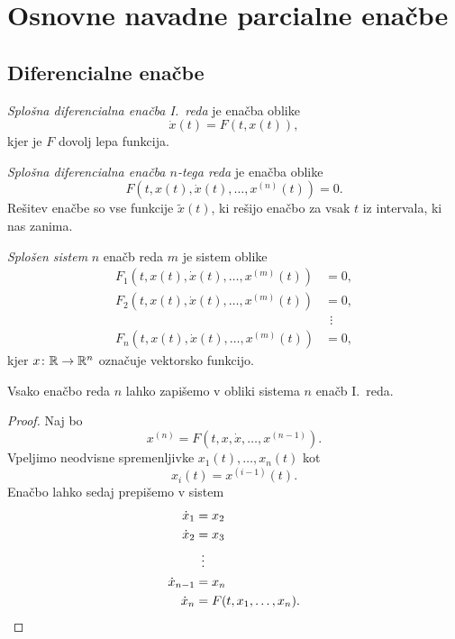 \section{Osnovne navadne parcialne enačbe}

\subsection{Diferencialne enačbe}


\begin{definicija}
\emph{Splošna diferencialna enačba I.~reda}
je enačba oblike
\[
\dot{x}(t) = F(t, x(t)),
\]
kjer je $F$ dovolj lepa funkcija.
\end{definicija}

\begin{definicija}
\emph{Splošna diferencialna enačba $n$-tega reda}
je enačba oblike
\[
F(t, x(t), \dot{x}(t), \dots, x^{(n)}(t)) = 0.
\]
Rešitev enačbe so vse funkcije $\widetilde{x}(t)$, ki rešijo enačbo
za vsak $t$ iz intervala, ki nas zanima.
\end{definicija}

\begin{definicija}
\emph{Splošen sistem} $n$ enačb
reda $m$ je sistem oblike
\begin{align*}
F_1(t, x(t), \dot{x}(t), \dots, x^{(m)}(t)) &= 0,
\\
F_2(t, x(t), \dot{x}(t), \dots, x^{(m)}(t)) &= 0,
\\
& ~~\! \vdots
\\
F_n(t, x(t), \dot{x}(t), \dots, x^{(m)}(t)) &= 0,
\end{align*}
kjer $x \colon \mathbb{R} \to \mathbb{R}^n$ označuje vektorsko funkcijo.
\end{definicija}

\begin{trditev}
Vsako enačbo reda $n$ lahko zapišemo v obliki sistema $n$ enačb
I.~reda.
\end{trditev}

\begin{proof}
Naj bo
\[
x^{(n)} = F(t, x, \dot{x}, \dots, x^{(n-1)}).
\]
Vpeljimo neodvisne spremenljivke $x_1(t), \dots, x_n(t)$ kot
\[
x_i(t) = x^{(i-1)}(t).
\]
Enačbo lahko sedaj prepišemo v sistem
\begin{align*}
\dot{x}_1 &= x_2
\\
\dot{x}_2 &= x_3
\\
&~~\! \vdots
\\
\dot{x}_{n-1} &= x_n
\\
\dot{x}_n &= F(t, x_1, \dots, x_n). \qedhere
\end{align*}
\end{proof}

